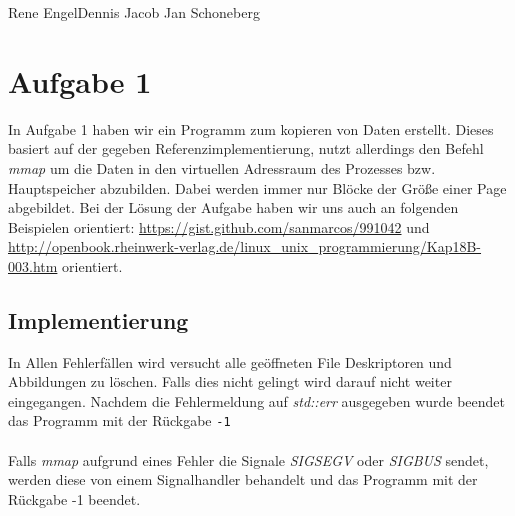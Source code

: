 \documentclass{ti2}
\begin{document}
%
                {Rene Engel}{Dennis Jacob}%
                {Jan Schoneberg}%
                


\section*{Aufgabe 1}
In Aufgabe 1 haben wir ein Programm zum kopieren von Daten erstellt. Dieses basiert auf der gegeben Referenzimplementierung, nutzt allerdings den Befehl \textit{mmap} um die Daten in den virtuellen Adressraum des Prozesses bzw. Hauptspeicher abzubilden. Dabei werden immer nur Blöcke der Größe einer Page abgebildet. Bei der Lösung der Aufgabe haben wir uns auch an folgenden Beispielen orientiert: \url{https://gist.github.com/sanmarcos/991042} und \url{http://openbook.rheinwerk-verlag.de/linux_unix_programmierung/Kap18B-003.htm} orientiert. 
\subsection*{Implementierung}
In Allen Fehlerfällen wird versucht alle geöffneten File Deskriptoren und Abbildungen zu löschen. Falls dies nicht gelingt wird darauf nicht weiter eingegangen. Nachdem die Fehlermeldung auf \textit{std::err} ausgegeben wurde beendet das Programm mit der Rückgabe \texttt{-1}\\ \\
Falls \textit{mmap} aufgrund eines Fehler die Signale \textit{SIGSEGV} oder \textit{SIGBUS} sendet, werden diese von einem Signalhandler behandelt und das Programm mit der Rückgabe -1 beendet. 
 
\end{document}
